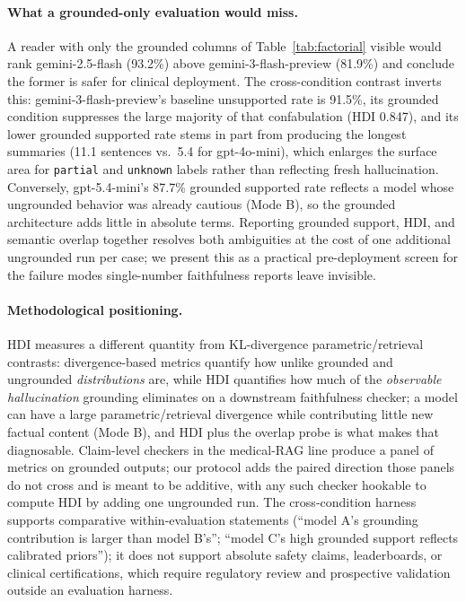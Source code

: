 \documentclass{article}
\theoremstyle{plain}
\begin{document}
\paragraph{What a grounded-only evaluation would miss.} A reader with only the grounded columns of Table~\ref{tab:factorial} visible would rank gemini-2.5-flash (93.2\%) above gemini-3-flash-preview (81.9\%) and conclude the former is safer for clinical deployment. The cross-condition contrast inverts this: gemini-3-flash-preview's baseline unsupported rate is 91.5\%, its grounded condition suppresses the large majority of that confabulation (HDI 0.847), and its lower grounded supported rate stems in part from producing the longest summaries (11.1 sentences vs.\ 5.4 for gpt-4o-mini), which enlarges the surface area for \texttt{partial} and \texttt{unknown} labels rather than reflecting fresh hallucination. Conversely, gpt-5.4-mini's 87.7\% grounded supported rate reflects a model whose ungrounded behavior was already cautious (Mode B), so the grounded architecture adds little in absolute terms. Reporting grounded support, HDI, and semantic overlap together resolves both ambiguities at the cost of one additional ungrounded run per case; we present this as a practical pre-deployment screen for the failure modes single-number faithfulness reports leave invisible.

\paragraph{Methodological positioning.} HDI measures a different quantity from KL-divergence parametric/retrieval contrasts: divergence-based metrics quantify how unlike grounded and ungrounded \emph{distributions} are, while HDI quantifies how much of the \emph{observable hallucination} grounding eliminates on a downstream faithfulness checker; a model can have a large parametric/retrieval divergence while contributing little new factual content (Mode B), and HDI plus the overlap probe is what makes that diagnosable. Claim-level checkers in the medical-RAG line produce a panel of metrics on grounded outputs; our protocol adds the paired direction those panels do not cross and is meant to be additive, with any such checker hookable to compute HDI by adding one ungrounded run. The cross-condition harness supports comparative within-evaluation statements (``model A's grounding contribution is larger than model B's''; ``model C's high grounded support reflects calibrated priors''); it does not support absolute safety claims, leaderboards, or clinical certifications, which require regulatory review and prospective validation outside an evaluation harness.
\end{document}
